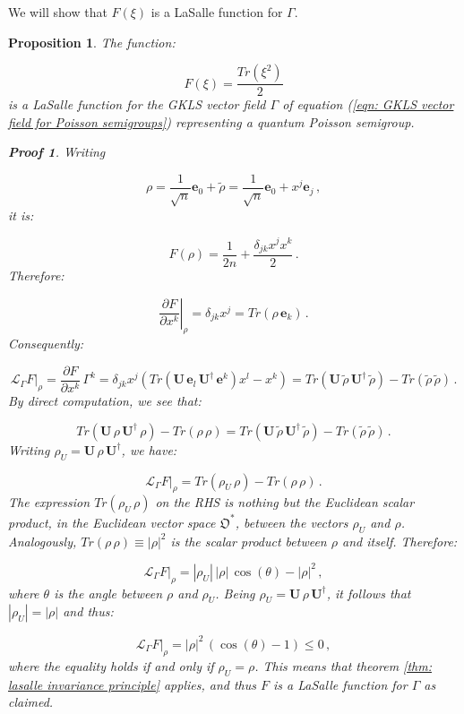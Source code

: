 \documentclass[11pt]{article}
\newcommand{\be}{\begin{equation}}
\newcommand{\ee}{\end{equation}}
\newcommand{\obsp}{\mathfrak{O}}
\newtheorem{prop}{Proposition}
\newtheorem*{pf}{Proof}
\begin{document}
We will show that $F(\xi)$ is a LaSalle function for $\Gamma$.

\begin{prop}
The function:

\be
F(\xi)=\frac{Tr\left(\xi^{2}\right)}{2}
\ee
is a LaSalle function for the GKLS vector field $\Gamma$ of equation (\ref{eqn: GKLS vector field for Poisson semigroups}) representing a quantum Poisson semigroup.

\begin{pf}
Writing 

\be
\rho= \frac{1}{\sqrt{n}}\mathbf{e}_{0} + \tilde{\rho}=\frac{1}{\sqrt{n}}\mathbf{e}_{0} + x^{j}\mathbf{e}_{j}\,,
\ee
it is:

\be
F(\rho)=\frac{1}{2n} + \frac{\delta_{jk}x^{j}x^{k}}{2}\,.
\ee
Therefore:

\be\label{eqn: derivative of purity}
\left.\frac{\partial F}{\partial x^{k}}\right|_{\rho}=\delta_{jk}x^{j}=Tr(\rho\,\mathbf{e}_{k})\,.
\ee
Consequently:

\be
\left.\mathcal{L}_{\Gamma}F\right|_{\rho}=\frac{\partial F}{\partial x^{k}}\,\Gamma^{k}=\delta_{jk}x^{j}\left(Tr\left(\mathbf{U}\,\mathbf{e}_{l}\,\mathbf{U}^{\dagger}\,\mathbf{e}^{k}\right)x^{l} - x^{k}\right)=Tr\left(\mathbf{U}\,\tilde{\rho}\,\mathbf{U}^{\dagger}\,\tilde{\rho}\right) - Tr\left(\tilde{\rho}\,\tilde{\rho}\right)\,.
\ee
By direct computation, we see that:

\be
Tr\left(\mathbf{U}\,\rho\,\mathbf{U}^{\dagger}\,\rho\right) - Tr\left(\rho\,\rho\right)= Tr\left(\mathbf{U}\,\tilde{\rho}\,\mathbf{U}^{\dagger}\,\tilde{\rho}\right) - Tr\left(\tilde{\rho}\,\tilde{\rho}\right)\,.
\ee
Writing $\rho_{U}=\mathbf{U}\,\rho\,\mathbf{U}^{\dagger}$, we have:

\be
\left.\mathcal{L}_{\Gamma}F\right|_{\rho}=Tr\left(\rho_{U}\,\rho\right) - Tr\left(\rho\,\rho\right)\,.
\ee
The expression $Tr\left(\rho_{U}\,\rho\right)$ on the RHS is nothing but the Euclidean scalar product,  in the Euclidean vector space $\obsp^{*}$, between the vectors $\rho_{U}$ and $\rho$.
Analogously, $Tr\left(\rho\,\rho\right)\equiv|\rho|^{2}$ is the scalar product between $\rho$ and itself.
Therefore:

\be
\left.\mathcal{L}_{\Gamma}F\right|_{\rho}=|\rho_{U}|\,|\rho|\,\cos(\theta) - |\rho|^{2}\,,
\ee
where $\theta$ is the angle between $\rho$ and $\rho_{U}$.
Being $\rho_{U}=\mathbf{U}\,\rho\,\mathbf{U}^{\dagger}$, it follows that $|\rho_{U}|=|\rho|$ and thus:

\be\label{eqn: derivative of the lasalle function for poisson semigroups}
\left.\mathcal{L}_{\Gamma}F\right|_{\rho}=|\rho|^{2}\,\left(\cos(\theta) - 1\right)\leq 0\,,
\ee
where the equality holds if and only if $\rho_{U}=\rho$.
This means that theorem \ref{thm: lasalle invariance principle} applies, and thus $F$ is a LaSalle function for $\Gamma$ as claimed.
\end{pf}
\end{prop}
\end{document}
